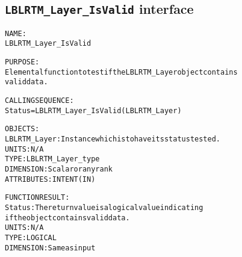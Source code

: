 \subsection{\texttt{LBLRTM\_Layer\_IsValid} interface}
  \label{sec:LBLRTM_Layer_IsValid_interface}
  \begin{alltt}
 
  NAME:
        LBLRTM_Layer_IsValid
 
  PURPOSE:
        Elemental function to test if the LBLRTM_Layer object contains
        valid data.
 
  CALLING SEQUENCE:
        Status = LBLRTM_Layer_IsValid( LBLRTM_Layer )
 
  OBJECTS:
        LBLRTM_Layer:  Instance which is to have its status tested.
                       UNITS:      N/A
                       TYPE:       LBLRTM_Layer_type
                       DIMENSION:  Scalar or any rank
                       ATTRIBUTES: INTENT(IN)
 
  FUNCTION RESULT:
        Status:        The return value is a logical value indicating
                       if the object contains valid data.
                       UNITS:      N/A
                       TYPE:       LOGICAL
                       DIMENSION:  Same as input
 
  \end{alltt}
